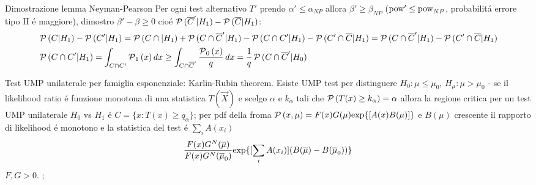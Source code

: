 \begin{wordonframe}{Dimostrazione lemma Neyman-Pearson}
Per ogni test alternativo $T'$ prendo $\alpha'\leq\alpha_{NP}$ allora $\beta'\geq\beta_{NP}$ ($\operatorname{pow}'\leq\operatorname{pow}_{NP}$, probabilit\'a errore tipo II \'e maggiore), dimostro $\beta'-\beta\geq0$ cio\'e $\operatorname{\mathcal{P}}{(\overline{C}'|H_1)}-\operatorname{\mathcal{P}}{(\overline{C}|H_1)}$:
\begin{align*}
&\operatorname{\mathcal{P}}{(C|H_1)}-\operatorname{\mathcal{P}}{(C'|H_1)}=\operatorname{\mathcal{P}}{(C\cap|H_1)}+\operatorname{\mathcal{P}}{(C\cap\overline{C}'|H_1)}-\operatorname{\mathcal{P}}{(C\cap C'|H_1)}-\operatorname{\mathcal{P}}{(C'\cap\overline{C}|H_1)}=\operatorname{\mathcal{P}}{(C\cap\overline{C}'|H_1)}-\operatorname{\mathcal{P}}{(C'\cap\overline{C}|H_1)}\\
&\operatorname{\mathcal{P}}{(C\cap C'|H_1)}=\int_{C\cap C'}\operatorname{\mathcal{P}}_1{(x)}\,dx\geq\int_{C\cap \overline{C}'}\frac{\operatorname{\mathcal{P}}_0{(x)}}{q}\,dx=\frac{1}{q}\operatorname{\mathcal{P}}{(C\cap\overline{C}'|H_0)}
\end{align*}
\end{wordonframe}

\begin{frame}{Test UMP unilaterale per famiglia esponenziale: Karlin-Rubin theorem.}
	Esiste UMP test per distinguere $H_0: \mu\leq\mu_0$, $H_{\mu}: \mu>\mu_0$ - se il likelihood ratio \'e funzione monotona di una statistica $T(\vec{X})$ e scelgo $\alpha$ e $k_{\alpha}$ tali che $\operatorname{\mathcal{P}}{(T(x)\geq k_{\alpha})}=\alpha$  allora la regione critica per un test UMP unilaterale $H_0$ vs $H_1$ \'e $C=\{x:T(x)\geq q_{\alpha}\}$; per pdf della froma $\operatorname{\mathcal{P}}{(x,\mu)}=F(x)G(\mu)\text{exp}\{[A(x)B(\mu)]\}$ e $B(\mu)$ crescente il rapporto di likelihood \'e monotono e la statistica del test \'e $\sum_iA(x_i)$
\[\frac{F(x)G^N(\overline{\mu})}{F(x)G^N(\overline{\mu}_0)}\text{exp}\{[\sum_iA(x_i)](B(\overline{\mu})-B(\overline{\mu}_0))\}\]
$F,G>0$.
\cite[5]{lrtmptumpt}; \cite[445]{inferencemukhopadhyay2000}
\end{frame}

